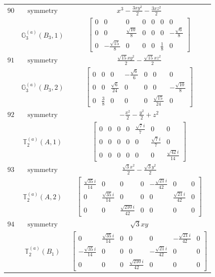 \documentclass[fleqn,8pt,landscape]{jsarticle}
\begin{document}
\begin{longtable}{ccc}
$ 90 $ & $ \text{symmetry} $ & $ x^{3} - \frac{3 x y^{2}}{2} - \frac{3 x z^{2}}{2} $ \\
$  $ & $ \mathbb{G}_{3}^{(a)}(B_{3},1) $ & $ \begin{bmatrix} 0 & 0 & 0 & 0 & 0 & 0 & 0 \\ 0 & 0 & \frac{\sqrt{10}}{8} & 0 & 0 & 0 & - \frac{\sqrt{6}}{8} \\ 0 & - \frac{\sqrt{15}}{8} & 0 & 0 & 0 & \frac{1}{8} & 0 \end{bmatrix} $ \\ \hline
$ 91 $ & $ \text{symmetry} $ & $ \frac{\sqrt{15} x y^{2}}{2} - \frac{\sqrt{15} x z^{2}}{2} $ \\
$  $ & $ \mathbb{G}_{3}^{(a)}(B_{3},2) $ & $ \begin{bmatrix} 0 & 0 & 0 & - \frac{\sqrt{6}}{6} & 0 & 0 & 0 \\ 0 & 0 & \frac{\sqrt{6}}{24} & 0 & 0 & 0 & - \frac{\sqrt{10}}{8} \\ 0 & \frac{3}{8} & 0 & 0 & 0 & \frac{\sqrt{15}}{24} & 0 \end{bmatrix} $ \\ \hline
$ 92 $ & $ \text{symmetry} $ & $ - \frac{x^{2}}{2} - \frac{y^{2}}{2} + z^{2} $ \\
$  $ & $ \mathbb{T}_{2}^{(a)}(A,1) $ & $ \begin{bmatrix} 0 & 0 & 0 & 0 & \frac{\sqrt{7} i}{7} & 0 & 0 \\ 0 & 0 & 0 & 0 & 0 & \frac{\sqrt{7} i}{7} & 0 \\ 0 & 0 & 0 & 0 & 0 & 0 & \frac{\sqrt{42} i}{14} \end{bmatrix} $ \\ \hline
$ 93 $ & $ \text{symmetry} $ & $ \frac{\sqrt{3} x^{2}}{2} - \frac{\sqrt{3} y^{2}}{2} $ \\
$  $ & $ \mathbb{T}_{2}^{(a)}(A,2) $ & $ \begin{bmatrix} \frac{\sqrt{35} i}{14} & 0 & 0 & 0 & - \frac{\sqrt{21} i}{42} & 0 & 0 \\ 0 & \frac{\sqrt{35} i}{14} & 0 & 0 & 0 & \frac{\sqrt{21} i}{42} & 0 \\ 0 & 0 & \frac{\sqrt{210} i}{42} & 0 & 0 & 0 & 0 \end{bmatrix} $ \\ \hline
$ 94 $ & $ \text{symmetry} $ & $ \sqrt{3} x y $ \\
$  $ & $ \mathbb{T}_{2}^{(a)}(B_{1}) $ & $ \begin{bmatrix} 0 & \frac{\sqrt{35} i}{14} & 0 & 0 & 0 & - \frac{\sqrt{21} i}{42} & 0 \\ - \frac{\sqrt{35} i}{14} & 0 & 0 & 0 & - \frac{\sqrt{21} i}{42} & 0 & 0 \\ 0 & 0 & 0 & \frac{\sqrt{210} i}{42} & 0 & 0 & 0 \end{bmatrix} $ \\ \hline

\end{longtable}
\end{document}
